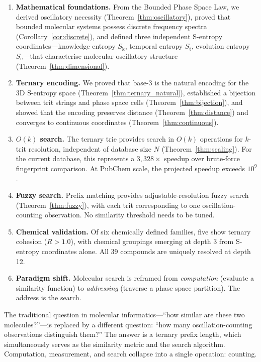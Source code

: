\documentclass[11pt,a4paper]{article}
\theoremstyle{definition}
\theoremstyle{remark}
\newcommand{\Sk}{S_{\mathrm{k}}}
\newcommand{\St}{S_{\mathrm{t}}}
\newcommand{\Se}{S_{\mathrm{e}}}
\begin{document}
\begin{enumerate}
\item \textbf{Mathematical foundations.} From the Bounded Phase Space Law, we derived oscillatory necessity (Theorem~\ref{thm:oscillatory}), proved that bounded molecular systems possess discrete frequency spectra (Corollary~\ref{cor:discrete}), and defined three independent S-entropy coordinates---knowledge entropy $\Sk$, temporal entropy $\St$, evolution entropy $\Se$---that characterise molecular oscillatory structure (Theorem~\ref{thm:dimensional}).

\item \textbf{Ternary encoding.} We proved that base-3 is the natural encoding for the 3D S-entropy space (Theorem~\ref{thm:ternary_natural}), established a bijection between trit strings and phase space cells (Theorem~\ref{thm:bijection}), and showed that the encoding preserves distance (Theorem~\ref{thm:distance}) and converges to continuous coordinates (Theorem~\ref{thm:continuous}).

\item \textbf{$O(k)$ search.} The ternary trie provides search in $O(k)$ operations for $k$-trit resolution, independent of database size $N$ (Theorem~\ref{thm:scaling}). For the current database, this represents a $3{,}328\times$ speedup over brute-force fingerprint comparison. At PubChem scale, the projected speedup exceeds $10^9$.

\item \textbf{Fuzzy search.} Prefix matching provides adjustable-resolution fuzzy search (Theorem~\ref{thm:fuzzy}), with each trit corresponding to one oscillation-counting observation. No similarity threshold needs to be tuned.

\item \textbf{Chemical validation.} Of six chemically defined families, five show ternary cohesion ($R > 1.0$), with chemical groupings emerging at depth 3 from S-entropy coordinates alone. All 39 compounds are uniquely resolved at depth 12.

\item \textbf{Paradigm shift.} Molecular search is reframed from \emph{computation} (evaluate a similarity function) to \emph{addressing} (traverse a phase space partition). The address is the search.
\end{enumerate}

The traditional question in molecular informatics---``how similar are these two molecules?''---is replaced by a different question: ``how many oscillation-counting observations distinguish them?'' The answer is a ternary prefix length, which simultaneously serves as the similarity metric and the search algorithm. Computation, measurement, and search collapse into a single operation: counting.
\end{document}

